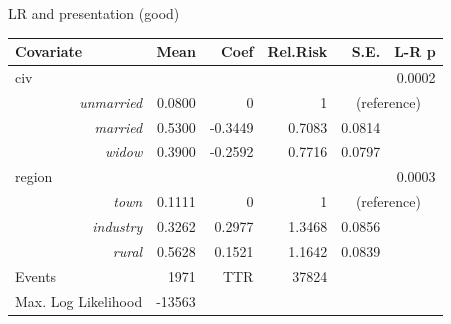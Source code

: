 \begin{frame}{LR and presentation (good)}

\begin{table}[ht] 
\begin{center} 
\begin{tabular}{lrrrrr} 
\hline 
Covariate & Mean & Coef & Rel.Risk & S.E. &   L-R p \\ \hline
civ  & & & & & 0.0002  \\ 
\multicolumn{1}{r}{\em unmarried} &   0.0800 & 0 & 1 & \multicolumn{2}{c}{(reference)} \\ 
\multicolumn{1}{r}{ \em married }  &    0.5300  &  -0.3449  &  0.7083  &  0.0814\\ 
\multicolumn{1}{r}{ \em widow }  &    0.3900  &  -0.2592  &  0.7716  &  0.0797\\ 
region  & & & & & 0.0003  \\ 
\multicolumn{1}{r}{\em town} &   0.1111 & 0 & 1 & \multicolumn{2}{c}{(reference)} \\ 
\multicolumn{1}{r}{ \em industry }  &    0.3262  &  0.2977  &  1.3468  &  0.0856\\ 
\multicolumn{1}{r}{ \em rural }  &    0.5628  &  0.1521  &  1.1642  &  0.0839\\ 
\hline 
Events &  1971  & TTR &  37824 \\ 
Max. Log Likelihood &  -13563 \\ \hline 
\hline 
\end{tabular}
\end{center} 
\end{table}

\end{frame}

